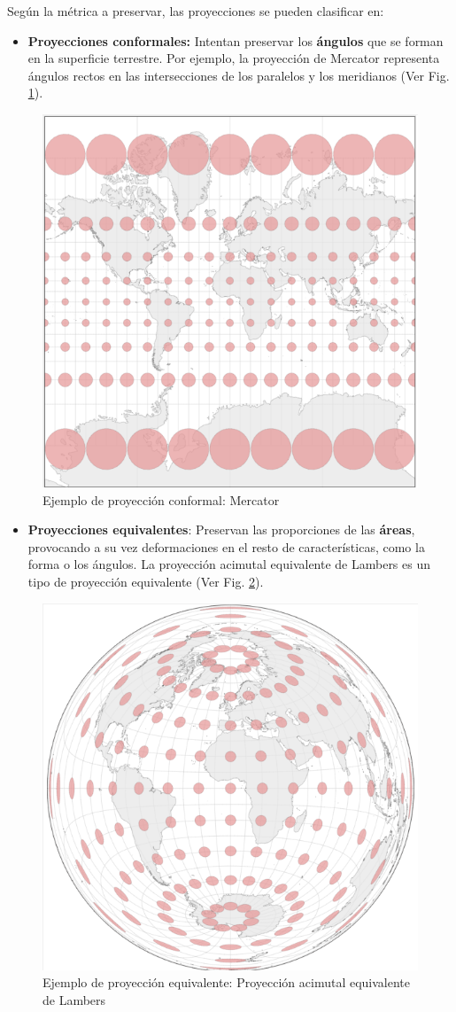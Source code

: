 \documentclass[
]{book}
\providecommand{\tightlist}{%
  \setlength{\itemsep}{0pt}\setlength{\parskip}{0pt}}
\theoremstyle{definition}
\theoremstyle{definition}
\theoremstyle{definition}
\theoremstyle{definition}
\theoremstyle{remark}
\begin{document}
Según la métrica a preservar, las proyecciones se pueden clasificar en:

\begin{itemize}
\tightlist
\item
  \textbf{Proyecciones conformales:} Intentan preservar los \textbf{ángulos} que se
  forman en la superficie terrestre. Por ejemplo, la proyección de Mercator
  representa ángulos rectos en las intersecciones de los paralelos y los
  meridianos (Ver Fig. \ref{fig:conform}).
\end{itemize}

\begin{figure}

{\centering \includegraphics[width=0.3\linewidth]{img/conform} 

}

\caption{Ejemplo de proyección conformal: Mercator}\label{fig:conform}
\end{figure}

\begin{itemize}
\tightlist
\item
  \textbf{Proyecciones equivalentes}: Preservan las proporciones de las \textbf{áreas},
  provocando a su vez deformaciones en el resto de características, como la
  forma o los ángulos. La proyección acimutal equivalente de Lambers es un
  tipo de proyección equivalente (Ver Fig. \ref{fig:equiv}).
\end{itemize}

\begin{figure}

{\centering \includegraphics[width=0.3\linewidth]{img/equiv} 

}

\caption{Ejemplo de proyección equivalente: Proyección acimutal equivalente de Lambers}\label{fig:equiv}
\end{figure}
\end{document}

